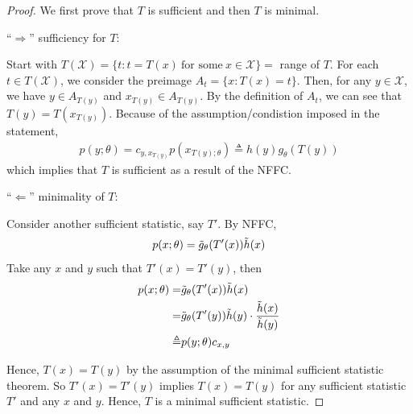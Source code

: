 \begin{proof}
    We first prove that $T$ is sufficient and then $T$ is minimal.

    ``$\Rightarrow$'' sufficiency for $T$:

    Start with $T(\mathcal{X})=\{t:t=T(x)~\text{for some}~x\in\mathcal{X}\}=$ range of $T$.
    For each $t\in T(\mathcal{X})$, we consider the preimage $A_t=\{x:T(x)=t\}$.
    Then, for any $y\in\mathcal{X}$, we have $y\in A_{T(y)}$ and $x_{T(y)}\in A_{T(y)}$.
    By the definition of $A_t$, we can see that $T(y)=T(x_{T(y)})$.
    Because of the assumption/condistion imposed in the statement,
    \begin{gather}
        p(y;\theta)=c_{y,x_{T(y)}}p(x_{T(y);\theta})\triangleq h(y)g_\theta(T(y))
    \end{gather}
    which implies that $T$ is sufficient as a result of the NFFC.

    ``$\Leftarrow$'' minimality of $T$:

    Consider another sufficient statistic, say $T'$. 
    By NFFC,
    \begin{gather}
        p(x;\theta)=\Tilde{g}_\theta(T'(x))\Tilde{h}(x)
    \end{gather}
    Take any $x$ and $y$ such that $T'(x)=T'(y)$, then
    \begin{align}
        p(x;\theta)
        =& \Tilde{g}_\theta(T'(x))\Tilde{h}(x)\\
        =& \Tilde{g}_\theta(T'(y))\Tilde{h}(y)\cdot\frac{\Tilde{h}(x)}{\Tilde{h}(y)}\\
        \triangleq& p(y;\theta)c_{x,y}
    \end{align}
    
    Hence, $T(x)=T(y)$ by the assumption of the minimal sufficient statistic theorem.
    So $T'(x)=T'(y)$ implies $T(x)=T(y)$ for any sufficient statistic $T'$ and any $x$ and $y$.
    Hence, $T$ is a minimal sufficient statistic.
\end{proof}


